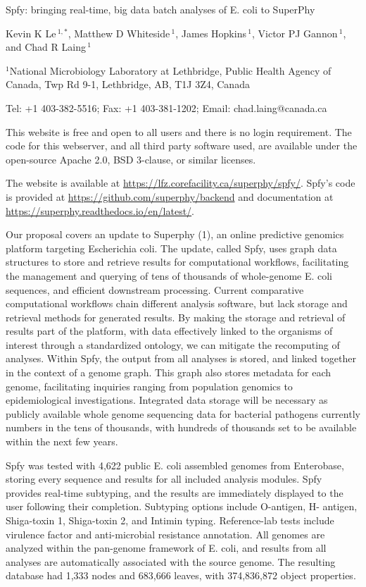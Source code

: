 \documentclass{article}
\begin{document}
Spfy: bringing real-time, big data batch analyses of E. coli to SuperPhy

Kevin K Le\,$^{1, *}$,
Matthew D Whiteside\,$^{1}$,
James Hopkins\,$^{1}$,
Victor PJ Gannon\,$^{1}$,
and Chad R Laing\,$^{1}$

$^{1}$National Microbiology Laboratory at Lethbridge, Public Health Agency of Canada, Twp Rd 9-1, Lethbridge, AB, T1J 3Z4, Canada

Tel: +1 403-382-5516; Fax: +1 403-381-1202; Email: chad.laing@canada.ca

This website is free and open to all users and there is no login requirement. The code for this webserver, and all third party software used, are available under the open-source Apache 2.0, BSD 3-clause, or similar licenses.

The website is available at \url{https://lfz.corefacility.ca/superphy/spfy/}. Spfy’s code is provided at \url{https://github.com/superphy/backend} and documentation at \url{https://superphy.readthedocs.io/en/latest/}.

Our proposal covers an update to Superphy (1), an online predictive genomics platform targeting Escherichia coli. The update, called Spfy, uses graph data structures to store and retrieve results for computational workflows, facilitating the management and querying of tens of thousands of whole-genome E. coli sequences, and efficient downstream processing. Current comparative computational workflows chain different analysis software, but lack storage and retrieval methods for generated results. By making the storage and retrieval of results part of the platform, with data effectively linked to the organisms of interest through a standardized ontology, we can mitigate the recomputing of analyses. Within Spfy, the output from all analyses is stored, and linked together in the context of a genome graph. This graph also stores metadata for each genome, facilitating inquiries ranging from population genomics to epidemiological investigations. Integrated data storage will be necessary as publicly available whole genome sequencing data for bacterial pathogens currently numbers in the tens of thousands, with hundreds of thousands set to be available within the next few years.

Spfy was tested with 4,622 public E. coli assembled genomes from Enterobase, storing every sequence and results for all included analysis modules. Spfy provides real-time subtyping, and the results are immediately displayed to the user following their completion. Subtyping options include O-antigen, H- antigen, Shiga-toxin 1, Shiga-toxin 2, and Intimin typing. Reference-lab tests include virulence factor and anti-microbial resistance annotation. All genomes are analyzed within the pan-genome framework of E. coli, and results from all analyses are automatically associated with the source genome. The resulting database had 1,333 nodes and 683,666 leaves, with 374,836,872 object properties.
\end{document}
